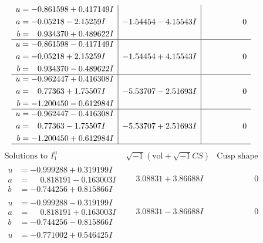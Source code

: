 \documentclass[1p]{elsarticle_modified}
\theoremstyle{definition}
\newcommand{\I}{\sqrt{-1}}
\begin{document}
$$\begin{array}{c|c|c}
\begin{aligned}
u &= -0.861598 + 0.417149 I \\
a &= -0.05218 - 2.15259 I \\
b &= \phantom{-}0.934370 + 0.489622 I\end{aligned}
 & -1.54454 - 4.15543 I & \phantom{-0.000000 } 0 \\ \hline\begin{aligned}
u &= -0.861598 - 0.417149 I \\
a &= -0.05218 + 2.15259 I \\
b &= \phantom{-}0.934370 - 0.489622 I\end{aligned}
 & -1.54454 + 4.15543 I & \phantom{-0.000000 } 0 \\ \hline\begin{aligned}
u &= -0.962447 + 0.416308 I \\
a &= \phantom{-}0.77363 + 1.75507 I \\
b &= -1.200450 - 0.612984 I\end{aligned}
 & -5.53707 - 2.51693 I & \phantom{-0.000000 } 0 \\ \hline\begin{aligned}
u &= -0.962447 - 0.416308 I \\
a &= \phantom{-}0.77363 - 1.75507 I \\
b &= -1.200450 + 0.612984 I\end{aligned}
 & -5.53707 + 2.51693 I & \phantom{-0.000000 } 0\\
 \hline 
 \end{array}$$\newpage$$\begin{array}{c|c|c}  
\text{Solutions to }I^u_{1}& \I (\text{vol} + \sqrt{-1}CS) & \text{Cusp shape}\\
 \hline 
\begin{aligned}
u &= -0.999288 + 0.319199 I \\
a &= \phantom{-}0.818191 - 0.163003 I \\
b &= -0.744256 + 0.815866 I\end{aligned}
 & \phantom{-}3.08831 + 3.86688 I & \phantom{-0.000000 } 0 \\ \hline\begin{aligned}
u &= -0.999288 - 0.319199 I \\
a &= \phantom{-}0.818191 + 0.163003 I \\
b &= -0.744256 - 0.815866 I\end{aligned}
 & \phantom{-}3.08831 - 3.86688 I & \phantom{-0.000000 } 0 \\ \hline\begin{aligned}
u &= -0.771002 + 0.546425 I \\

\end{aligned}
\end{array}$$
\end{document}
